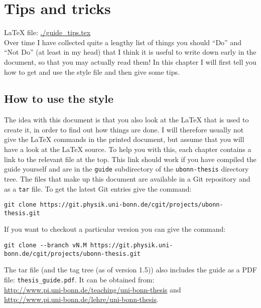 
\chapter{Tips and tricks}
\label{sec:tips}

\LaTeX{} file: \url{./guide_tips.tex}\\[1ex]
\noindent
Over time I have collected quite a lengthy list of things you should
\enquote{Do} and \enquote{Not Do} (at least in my head) that I think
it is useful to write down early in the document, so that you may
actually read them!  In this chapter I will first tell you how to get
and use the style file and then give some tips.

\section{How to use the  style}
\label{sec:tips:howto}

The idea with this document is that you also look at the \LaTeX{} that
is used to create it, in order to find out how things are done.  I
will therefore usually not give the \LaTeX{} commands in the printed
document, but assume that you will have a look at the \LaTeX{} source.
To help you with this, each chapter contains a link to the relevant
file at the top. This link should work if you have compiled the guide
yourself and are in the \texttt{guide} subdirectory of the
\texttt{ubonn-thesis} directory tree.  The files that make up this
document are available in a Git repository and as a
\texttt{tar} file. To get the latest Git entries give the
command:

{\small\begin{verbatim}
git clone https://git.physik.uni-bonn.de/cgit/projects/ubonn-thesis.git
\end{verbatim}}
\noindent
If you want to checkout a particular version you can give the command:
{\small\begin{verbatim}
git clone --branch vN.M https://git.physik.uni-bonn.de/cgit/projects/ubonn-thesis.git
\end{verbatim}}
\noindent
The tar file (and the tag tree (as of version 1.5)) also includes
the guide as a PDF file: \texttt{thesis\_guide.pdf}.  It can be
obtained from:\\
\url{http://www.pi.uni-bonn.de/teaching/uni-bonn-thesis}
and\\
\url{http://www.pi.uni-bonn.de/lehre/uni-bonn-thesis}.

